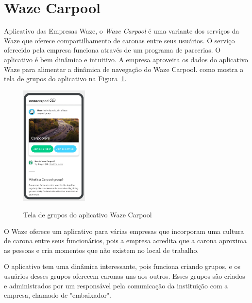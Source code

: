 \section{Waze Carpool}
Aplicativo das Empresas Waze, o \textit{Waze Carpool} é uma variante dos serviços da Waze que oferece compartilhamento de caronas entre seus usuários. O serviço oferecido pela empresa funciona através de um programa de parcerias. O aplicativo é bem dinâmico e intuitivo. A empresa aproveita os dados do aplicativo Waze para alimentar a dinâmica de navegação do Waze Carpool. como mostra a tela de grupos do aplicativo na Figura~\ref{fig:tela_grupos_wazecarpool}.

\begin{figure}[!hbtp]
	\centering
	\caption{Tela de grupos do aplicativo Waze Carpool}
	\includegraphics[width=0.3\textwidth]{./04-figuras/waze/Tela_de_grupos.png}
	\label{fig:tela_grupos_wazecarpool}
\end{figure}

O Waze oferece um aplicativo para várias empresas que incorporam uma cultura de carona entre seus funcionários, pois a empresa acredita que a carona aproxima as pessoas e cria momentos que não existem no local de trabalho.

O aplicativo tem uma dinâmica interessante, pois funciona criando grupos, e os usuários desses grupos oferecem caronas uns aos outros. %
Esses grupos são criados e administrados por um responsável pela comunicação da instituição com a empresa, chamado de "embaixador".

